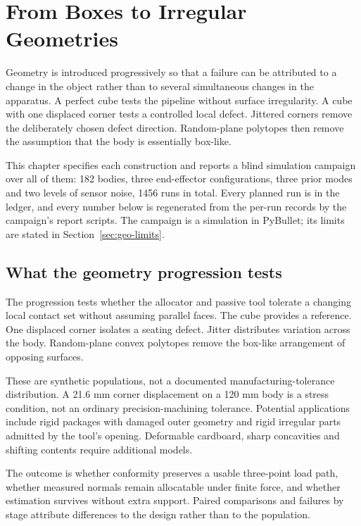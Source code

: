 \chapter{From Boxes to Irregular Geometries}
\label{ch:geometry}

Geometry is introduced progressively so that a failure can be attributed to a change in the object rather than to several simultaneous changes in the apparatus. A perfect cube tests the pipeline without surface irregularity. A cube with one displaced corner tests a controlled local defect. Jittered corners remove the deliberately chosen defect direction. Random-plane polytopes then remove the assumption that the body is essentially box-like.

This chapter specifies each construction and reports a blind simulation campaign over all of them: 182 bodies, three end-effector configurations, three prior modes and two levels of sensor noise, 1456 runs in total. Every planned run is in the ledger, and every number below is regenerated from the per-run records by the campaign's report scripts. The campaign is a simulation in PyBullet; its limits are stated in Section~\ref{sec:geo-limits}.

\section{What the geometry progression tests}

The progression tests whether the allocator and passive tool tolerate a changing local contact set without assuming parallel faces. The cube provides a reference. One displaced corner isolates a seating defect. Jitter distributes variation across the body. Random-plane convex polytopes remove the box-like arrangement of opposing surfaces.

These are synthetic populations, not a documented manufacturing-tolerance distribution. A 21.6 mm corner displacement on a 120 mm body is a stress condition, not an ordinary precision-machining tolerance. Potential applications include rigid packages with damaged outer geometry and rigid irregular parts admitted by the tool's opening. Deformable cardboard, sharp concavities and shifting contents require additional models.

The outcome is whether conformity preserves a usable three-point load path, whether measured normals remain allocatable under finite force, and whether estimation survives without extra support. Paired comparisons and failures by stage attribute differences to the design rather than to the population.

